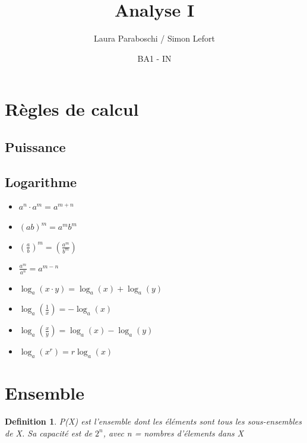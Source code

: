 \documentclass{article}
\title{Analyse I}
\author{Laura Paraboschi / Simon Lefort }
\date{BA1 - IN}
\newtheorem{definition}{Definition}[section]
\begin{document}
\maketitle

\section{Règles de calcul}

\begin{multicols}{2}
\subsection{Puissance}  
\columnbreak
\subsection{Logarithme}
\end{multicols}

\begin{multicols}{2}

\begin{itemize}
    \item \( a^n \cdot a^m = a^{m+n} \)
    \item \( (ab)^m = a^mb^m \)
    \item \( (\frac{a}{b})^m = (\frac{a^m}{b^m}) \)
    \item \( \frac{a^m}{a^n} = a^{m-n} \)
\end{itemize}
\columnbreak

\begin{itemize}
    \item \( \log_a(x \cdot y) = \log_a(x) + \log_a(y) \)
    \item \( \log_a(\frac{1}{x}) = -\log_a(x) \)
    \item \( \log_a(\frac{x}{y}) = \log_a(x) - \log_a(y) \)
    \item \( \log_a(x^r) = r\log_a(x) \)
\end{itemize}

\end{multicols}

\section{Ensemble}
\begin{definition}
P(X) est l'ensemble dont les éléments sont tous les sous-ensembles de X. Sa capacité est de  \(2^n\), avec n = nombres d'élements dans X
\end{definition}
\end{document}
